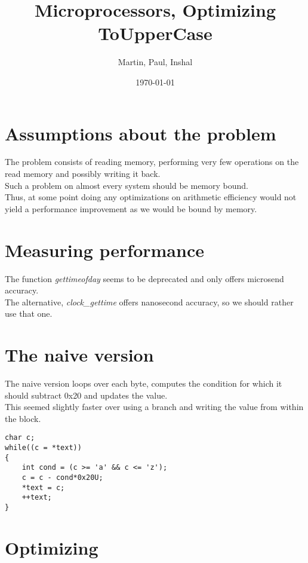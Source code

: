 \documentclass[10pt, fleqn]{article}
\title{Microprocessors, Optimizing ToUpperCase}
\author{Martin, Paul, Inshal}
\date{\today}
\begin{document}
\maketitle

\section{Assumptions about the problem}
The problem consists of reading memory, performing very few operations on the read memory and possibly writing it back.\\
Such a problem on almost every system should be memory bound.\\
Thus, at some point doing any optimizations on arithmetic efficiency would not yield a performance improvement as we would be bound by memory.\\

\section{Measuring performance}
The function \textit{gettimeofday} seems to be deprecated and only offers microsend accuracy.\\
The alternative, \textit{clock\_gettime} offers nanosecond accuracy, so we should rather use that one.

\section{The naive version}
The naive version loops over each byte, computes the condition for which it should subtract 0x20 and updates the value.\\
This seemed slightly faster over using a branch and writing the value from within the block.

\begin{lstlisting}
char c;
while((c = *text))
{
    int cond = (c >= 'a' && c <= 'z');
    c = c - cond*0x20U;
    *text = c;
    ++text;
}
\end{lstlisting}

\section{Optimizing}
\end{document}
